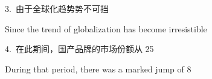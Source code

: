 \documentclass[a4paper, 12pt]{article}
\begin{document}
\begin{flushleft}
3.\ 由于全球化趋势势不可挡

Since the trend of globalization has become irresistible
\end{flushleft}

\begin{flushleft}
4.\ 在此期间，国产品牌的市场份额从 25%

During that period, there was a marked jump of 8%
\end{flushleft}
\end{document}
